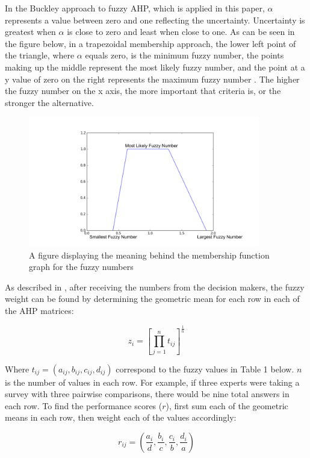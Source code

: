 \documentclass[12pt]{UIdahoMastersThesis}
\begin{document}
 In the Buckley approach to fuzzy AHP, which is applied in this paper, $\alpha$ represents a value between zero and one reflecting the uncertainty.  Uncertainty is greatest when $\alpha$ is close to zero and least when close to one. As can be seen in the figure below, in a trapezoidal membership approach, the lower left point of the triangle, where $\alpha$ equals zero, is the minimum fuzzy number, the points making up the middle represent the most likely fuzzy number, and the point at a y value of zero on the right represents the maximum fuzzy number \cite{Pan2008}. The higher the fuzzy number on the x axis, the more important that criteria is, or the stronger the alternative. 
\begin{figure}[h!]
  \caption{A figure displaying the meaning behind the membership function graph for the fuzzy numbers}
  \centering
  \includegraphics[width=0.9\textwidth]{Fuzzy_explaination.png}
\end{figure}
 
 As described in \cite{Kahraman2010}, after receiving the numbers from the decision makers, the fuzzy weight can be found by determining the geometric mean for each row in each of the AHP matrices:
 
 \begin{equation}
 z_i=[\prod_{j=1}^n t_{ij}]^{\frac{1}{n}}
 \end{equation}
 
 Where $t_{ij}=(a_{ij},b_{ij}, c_{ij}, d_{ij})$ correspond to the fuzzy values in Table 1 below. $n$ is the number of values in each row.  For example, if three experts were taking a survey with three pairwise comparisons, there would be nine total answers in each row. To find the performance scores ($r$), first sum each of the geometric means in each row, then weight each of the values accordingly:
 
\begin{equation}
r_{ij}=(\frac{a_i}{d},\frac{b_i}{c},\frac{c_i}{b},\frac{d_i}{a})
\end{equation} 
\end{document}
